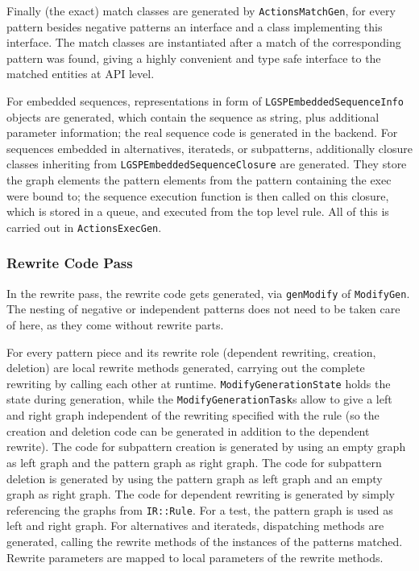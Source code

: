 Finally (the exact) match classes are generated by \texttt{Actions\-Match\-Gen}, for every pattern besides negative patterns an interface and a class implementing this interface.
The match classes are instantiated after a match of the corresponding pattern was found, giving a highly convenient and type safe interface to the matched entities at API level.

For embedded sequences, representations in form of \texttt{LGSP\-Embedded\-Sequence\-Info} objects are generated, which contain the sequence as string, plus additional parameter information; the real sequence code is generated in the backend.
For sequences embedded in alternatives, iterateds, or subpatterns, additionally closure classes inheriting from \texttt{LGSP\-Embedded\-Sequence\-Closure} are generated.
They store the graph elements the pattern elements from the pattern containing the exec were bound to; the sequence execution function is then called on this closure, which is stored in a queue, and executed from the top level rule.
All of this is carried out in \texttt{ActionsExecGen}.

\subsubsection*{Rewrite Code Pass}
In the rewrite pass, the rewrite code gets generated, via \texttt{gen\-Modify} of \texttt{Modify\-Gen}.
The nesting of negative or independent patterns does not need to be taken care of here, as they come without rewrite parts.

For every pattern piece and its rewrite role (dependent rewriting, creation, deletion) are local rewrite methods generated, carrying out the complete rewriting by calling each other at runtime.
\texttt{Modify\-Generation\-State} holds the state during generation, while the \texttt{Modify\-Generation\-Task}s allow to give a left and right graph independent of the rewriting specified with the rule (so the creation and deletion code can be generated in addition to the dependent rewrite).
The code for subpattern creation is generated by using an empty graph as left graph and the pattern graph as right graph.
The code for subpattern deletion is generated by using the pattern graph as left graph and an empty graph as right graph.
The code for dependent rewriting is generated by simply referencing the graphs from \texttt{IR::Rule}.
For a test, the pattern graph is used as left and right graph.
For alternatives and iterateds, dispatching methods are generated, calling the rewrite methods of the instances of the patterns matched.
Rewrite parameters are mapped to local parameters of the rewrite methods.

